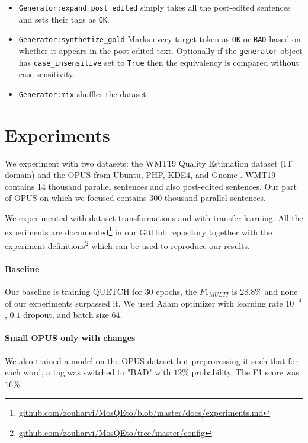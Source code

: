 \documentclass[12pt]{article}
\begin{document}
\begin{itemize}
    \item \texttt{Generator:expand\_post\_edited} simply takes all the post-edited sentences and sets their tags as \texttt{OK}.
    
    \item \texttt{Generator:synthetize\_gold} Marks every target token as \texttt{OK} or \texttt{BAD} based on whether it appears in the post-edited text. Optionally if the \texttt{generator} object has \texttt{case\_insensitive} set to \texttt{True} then the equivalency is compared without case sensitivity.
    
    \item \texttt{Generator:mix} shuffles the dataset. 
\end{itemize}

\section{Experiments}

We experiment with two datasets: the WMT19 Quality Estimation dataset (IT domain) and the OPUS from Ubuntu, PHP, KDE4, and Gnome \cite{opus:2012}. WMT19 contains 14 thousand parallel sentences and also post-edited sentences. Our part of OPUS on which we focused contains 300 thousand parallel sentences.

We experimented with dataset transformations and with transfer learning. All the experiments are documented\footnote{\href{https://github.com/zouharvi/MosQEto/blob/master/docs/experiments.md}{github.com/zouharvi/MosQEto/blob/master/docs/experiments.md}} in our GitHub repository together with the experiment definitions\footnote{\href{https://github.com/zouharvi/MosQEto/tree/master/config}{github.com/zouharvi/MosQEto/tree/master/config}} which can be used to reproduce our results.

\paragraph{Baseline} Our baseline is training QUETCH for $30$ epochs, the $F1_{MULTI}$ is $28.8\%$ and none of our experiments surpassed it.
We used Adam optimizer \cite{adam} with learning rate $10^{-4}$, $0.1$ dropout, and batch size $64$.

\paragraph{Small OPUS only with changes} We also trained a model on the OPUS dataset but preprocessing it such that for each word, a tag was switched to "BAD" with $12\%$ probability.
The F1 score was $16\%$.
\end{document}
